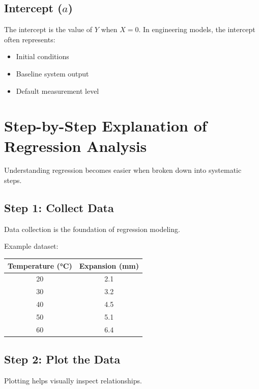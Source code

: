 \documentclass[12pt,a4paper]{article}
\begin{document}
	\subsection{Intercept ($a$)}
	The intercept is the value of $Y$ when $X = 0$. In engineering models, the intercept often represents:
	\begin{itemize}
		\item Initial conditions
		\item Baseline system output
		\item Default measurement level
	\end{itemize}
	
	\section{Step-by-Step Explanation of Regression Analysis}
	Understanding regression becomes easier when broken down into systematic steps.
	
	\subsection{Step 1: Collect Data}
	Data collection is the foundation of regression modeling.
	
	Example dataset:
	\begin{table}[h!]
		\centering
		\begin{tabular}{|c|c|}
			\hline
			\textbf{Temperature (°C)} & \textbf{Expansion (mm)} \\
			\hline
			20 & 2.1 \\
			30 & 3.2 \\
			40 & 4.5 \\
			50 & 5.1 \\
			60 & 6.4 \\
			\hline
		\end{tabular}
	\end{table}
	
	\subsection{Step 2: Plot the Data}
	Plotting helps visually inspect relationships.
	
	\begin{center}
	\end{center}
	
\end{document}
